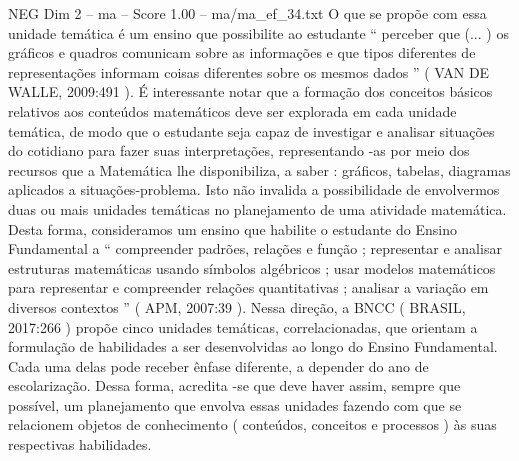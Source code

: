 \begin{textsample}{NEG Dim 2 – ma – Score 1.00 – ma/ma\_ef\_34.txt}
O que se propõe com essa unidade temática é um ensino que possibilite ao estudante “ perceber que (... ) os gráficos e quadros comunicam sobre as informações e que tipos diferentes de representações informam coisas diferentes sobre os mesmos dados ” ( VAN DE WALLE, 2009:491 ).
É interessante notar que a formação dos conceitos básicos relativos aos conteúdos matemáticos deve ser explorada em cada unidade temática, de modo que o estudante seja capaz de investigar e analisar situações do cotidiano para fazer suas interpretações, representando -as por meio dos recursos que a Matemática lhe disponibiliza, a saber : gráficos, tabelas, diagramas aplicados a situações-problema.
Isto não invalida a possibilidade de envolvermos duas ou mais unidades temáticas no planejamento de uma atividade matemática.
Desta forma, consideramos um ensino que habilite o estudante do Ensino Fundamental a “ compreender padrões, relações e função ; representar e analisar estruturas matemáticas usando símbolos algébricos ; usar modelos matemáticos para representar e compreender relações quantitativas ; analisar a variação em diversos contextos ” ( APM, 2007:39 ).
Nessa direção, a BNCC ( BRASIL, 2017:266 ) propõe cinco unidades temáticas, correlacionadas, que orientam a formulação de habilidades a ser desenvolvidas ao longo do Ensino Fundamental.
Cada uma delas pode receber ênfase diferente, a depender do ano de escolarização.
Dessa forma, acredita -se que deve haver assim, sempre que possível, um planejamento que envolva essas unidades fazendo com que se relacionem objetos de conhecimento ( conteúdos, conceitos e processos ) às suas respectivas habilidades.

\end{textsample}
